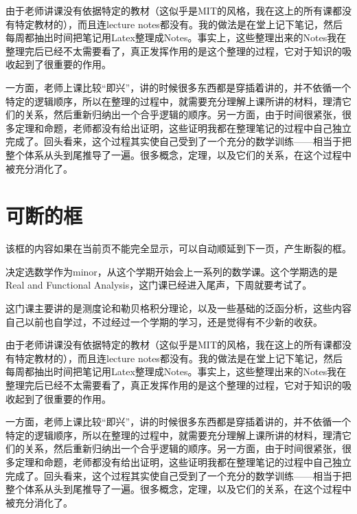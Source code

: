 \documentclass{ctexart}
\begin{document}
\begin{tcolorbox}[enhanced,fit to height=2cm,
  colback=green!25!black!10!white,colframe=green!75!black,title=Fit box (5cm),
  drop fuzzy shadow,watermark color=white,watermark text=Fit]
由于老师讲课没有依据特定的教材（这似乎是MIT的风格，我在这上的所有课都没有特定教材的），而且连lecture notes都没有。我的做法是在堂上记下笔记，然后每周都抽出时间把笔记用Latex整理成Notes。事实上，这些整理出来的Notes我在整理完后已经不太需要看了，真正发挥作用的是这个整理的过程，它对于知识的吸收起到了很重要的作用。

一方面，老师上课比较“即兴”，讲的时候很多东西都是穿插着讲的，并不依循一个特定的逻辑顺序，所以在整理的过程中，就需要充分理解上课所讲的材料，理清它们的关系，然后重新归纳出一个合乎逻辑的顺序。另一方面，由于时间很紧张，很多定理和命题，老师都没有给出证明，这些证明我都在整理笔记的过程中自己独立完成了。回头看来，这个过程其实使自己受到了一个充分的数学训练——相当于把整个体系从头到尾推导了一遍。很多概念，定理，以及它们的关系，在这个过程中被充分消化了。
\end{tcolorbox}
\section{可断的框}
该框的内容如果在当前页不能完全显示，可以自动顺延到下一页，产生断裂的框。
\begin{tcolorbox}[enhanced jigsaw,breakable,pad at break*=1mm,
  colback=blue!5!white,colframe=blue!75!black,title=Breakable box,
  watermark color=white,watermark text=\Roman{tcbbreakpart}]
决定选数学作为minor，从这个学期开始会上一系列的数学课。这个学期选的是Real and Functional Analysis，这门课已经进入尾声，下周就要考试了。

这门课主要讲的是测度论和勒贝格积分理论，以及一些基础的泛函分析，这些内容自己以前也自学过，不过经过一个学期的学习，还是觉得有不少新的收获。

由于老师讲课没有依据特定的教材（这似乎是MIT的风格，我在这上的所有课都没有特定教材的），而且连lecture notes都没有。我的做法是在堂上记下笔记，然后每周都抽出时间把笔记用Latex整理成Notes。事实上，这些整理出来的Notes我在整理完后已经不太需要看了，真正发挥作用的是这个整理的过程，它对于知识的吸收起到了很重要的作用。

一方面，老师上课比较“即兴”，讲的时候很多东西都是穿插着讲的，并不依循一个特定的逻辑顺序，所以在整理的过程中，就需要充分理解上课所讲的材料，理清它们的关系，然后重新归纳出一个合乎逻辑的顺序。另一方面，由于时间很紧张，很多定理和命题，老师都没有给出证明，这些证明我都在整理笔记的过程中自己独立完成了。回头看来，这个过程其实使自己受到了一个充分的数学训练——相当于把整个体系从头到尾推导了一遍。很多概念，定理，以及它们的关系，在这个过程中被充分消化了。
\end{tcolorbox}
\end{document}
